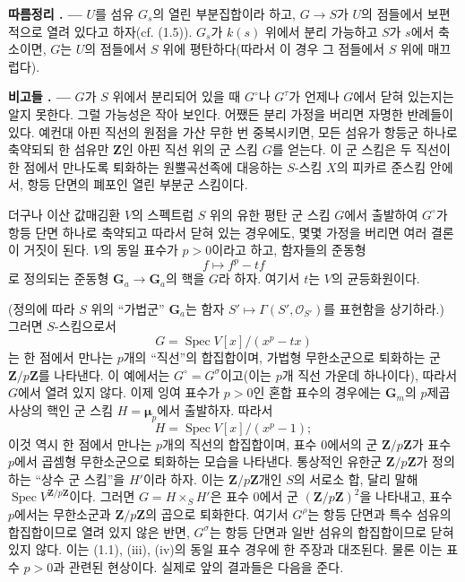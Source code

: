 \documentclass[11pt,twoside,openany]{book}
\numberwithin{equation}{section}
\newcommand{\sourceunit}{front}
\newcommand{\src}[1]{%
  \phantomsection\hypertarget{src:\sourceunit:#1}{}%
  \marginpar{\raggedleft\footnotesize\sffamily #1}%
}
\theoremstyle{plain}
\theoremstyle{definition}
\theoremstyle{remark}
\newcommand{\result}[2]{%
  \par\medskip\noindent\textbf{#1%
  \if\relax\detokenize{#2}\relax\else\space#2\fi. ---}\enspace
}
\begin{document}
\result{따름정리}{1.8} $U$를 섬유 $G_s$의 열린 부분집합이라 하고,
$G\longrightarrow S$가 $U$의 점들에서 보편적으로 열려 있다고 하자(cf.
(1.5)). $G_s$가 $k(s)$ 위에서 분리 가능하고 $S$가 $s$에서 축소이면,
$G$는 $U$의 점들에서 $S$ 위에 평탄하다(따라서 이 경우 그 점들에서
$S$ 위에 매끄럽다).

\result{비고들}{1.9} $G$가 $S$ 위에서 분리되어 있을 때 $G^\circ$나
$G^\tau$가 언제나 $G$에서 닫혀 있는지는 알지 못한다. 그럴 가능성은 작아
보인다. 어쨌든 분리 가정을 버리면 자명한 반례들이 있다. 예컨대 아핀 직선의
원점을 가산 무한 번 중복시키면, 모든 섬유가 항등군 하나로 축약되되 한 섬유만
$\mathbf Z$인 아핀 직선 위의 군 스킴 $G$를 얻는다. 이 군 스킴은 두 직선이
한 점에서 만나도록 퇴화하는 원뿔곡선족에 대응하는 $S$-스킴 $X$의 피카르
준스킴 안에서, 항등 단면의 폐포인 열린 부분군 스킴이다.

더구나 이산 값매김환 $V$의 스펙트럼 $S$ 위의 유한 평탄 군 스킴 $G$에서
출발하여 $G^\circ$가 항등 단면 하나로 축약되고 따라서 닫혀 있는 경우에도,
몇몇 가정을 버리면 여러 결론이 거짓이 된다. $V$의 동일 표수가 $p>0$이라고
하고, 함자들의 준동형
\[
f\longmapsto f^p-tf
\]
로 정의되는 준동형 $\mathbf G_a\longrightarrow\mathbf G_a$의 핵을 $G$라
하자. 여기서 $t$는 $V$의 균등화원이다.

\src{230}
(정의에 따라 $S$ 위의 ``가법군'' $\mathbf G_a$는 함자
$S'\longmapsto\Gamma(S',\mathcal O_{S'})$를 표현함을 상기하라.) 그러면
$S$-스킴으로서
\[
G=\operatorname{Spec}V[x]/(x^p-tx)
\]
는 한 점에서 만나는 $p$개의 ``직선''의 합집합이며, 가법형 무한소군으로
퇴화하는 군 $\mathbf Z/p\mathbf Z$를 나타낸다. 이 예에서는
$G^\circ=G^\sigma$이고(이는 $p$개 직선 가운데 하나이다), 따라서
$G$에서 열려 있지 않다. 이제 잉여 표수가 $p>0$인 혼합 표수의 경우에는
$\mathbf G_m$의 $p$제곱 사상의 핵인 군 스킴 $H=\symbf{\mu}_p$에서
출발하자. 따라서
\[
H=\operatorname{Spec}V[x]/(x^p-1) ;
\]
이것 역시 한 점에서 만나는 $p$개의 직선의 합집합이며, 표수 0에서의 군
$\mathbf Z/p\mathbf Z$가 표수 $p$에서 곱셈형 무한소군으로 퇴화하는 모습을
나타낸다. 통상적인 유한군 $\mathbf Z/p\mathbf Z$가 정의하는 ``상수 군
스킴''을 $H'$이라 하자. 이는 $\mathbf Z/p\mathbf Z$개인 $S$의 서로소 합,
달리 말해 $\operatorname{Spec}V^{\mathbf Z/p\mathbf Z}$이다. 그러면
$G=H\times_S H'$은 표수 0에서 군 $(\mathbf Z/p\mathbf Z)^2$을 나타내고,
표수 $p$에서는 무한소군과 $\mathbf Z/p\mathbf Z$의 곱으로 퇴화한다.
여기서 $G^\rho$는 항등 단면과 특수 섬유의 합집합이므로 열려 있지 않은
반면, $G^\sigma$는 항등 단면과 일반 섬유의 합집합이므로 닫혀 있지 않다.
이는 (1.1), (iii), (iv)의 동일 표수 경우에 한 주장과 대조된다. 물론 이는
표수 $p>0$과 관련된 현상이다. 실제로 앞의 결과들은 다음을 준다.
\end{document}
